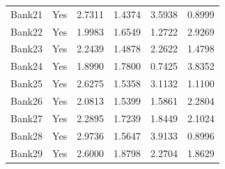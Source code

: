 \begin{longtable}{@{}lcrrrr@{}}
Bank21 & Yes & 2.7311 & 1.4374 & 3.5938 & 0.8999 \\
Bank22 & Yes & 1.9983 & 1.6549 & 1.2722 & 2.9269 \\
Bank23 & Yes & 2.2439 & 1.4878 & 2.2622 & 1.4798 \\
Bank24 & Yes & 1.8990 & 1.7800 & 0.7425 & 3.8352 \\
Bank25 & Yes & 2.6275 & 1.5358 & 3.1132 & 1.1100 \\
Bank26 & Yes & 2.0813 & 1.5399 & 1.5861 & 2.2804 \\
Bank27 & Yes & 2.2895 & 1.7239 & 1.8449 & 2.1024 \\
Bank28 & Yes & 2.9736 & 1.5647 & 3.9133 & 0.8996 \\
Bank29 & Yes & 2.6000 & 1.8798 & 2.2704 & 1.8629 \\
\end{longtable}


